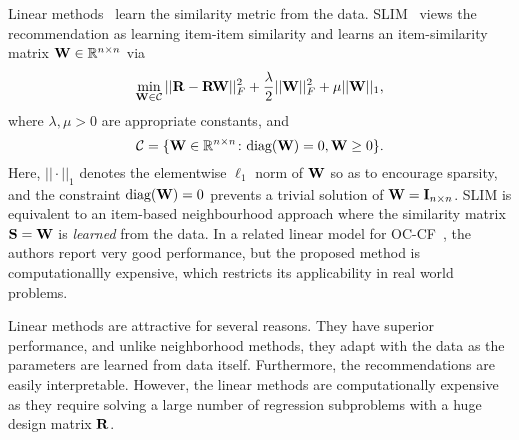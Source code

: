 Linear methods~\cite{Ning:2011, Sedhain:2016} learn the similarity metric from the data. SLIM~\citep{Ning:2011} views the recommendation as learning item-item similarity and learns an item-similarity matrix $\mathbf{W} \in \mathbb{R}^{n \times n}$ via
\begin{equation}
\label{eqn:slim}
\min_{ \mathbf{W} \in \mathcal{C} } || \mathbf{R} - \mathbf{R} \mathbf{W} ||_F^2 + \frac{\lambda}{2} || \mathbf{W} ||_F^2 + \mu || \mathbf{W} ||_1,
\end{equation}
where $\lambda, \mu > 0$ are appropriate constants, and
\begin{equation}
\label{eqn:slim-constraint}
\mathcal{C} = \{ \mathbf{W} \in \mathbb{R}^{n \times n} \colon \text{diag}( \mathbf{W} ) = 0, \mathbf{W} \geq 0 \}.
\end{equation}
Here, $|| \cdot ||_1$ denotes the elementwise $\ell_1$ norm of $\mathbf{W}$ so as to encourage sparsity, and the constraint $\text{diag}( \mathbf{W} ) = 0$ prevents a trivial solution of $\mathbf{W} = \mathbf{I}_{n \times n}$. SLIM is equivalent to an item-based neighbourhood approach where the similarity matrix $\mathbf{S} = \mathbf{W}$ is \emph{learned} from the data.
%
In a related linear model for OC-CF~\citep{Sedhain:2016}, the authors report very good performance, but the proposed method is computationallly expensive, which restricts its applicability in real world problems.


Linear methods are attractive for several reasons. They have superior performance, and unlike neighborhood methods, they adapt with the data as the parameters are learned from data itself. Furthermore, the recommendations are easily interpretable. However, the linear methods are computationally expensive as they require solving a large number of regression subproblems with a huge design matrix $\mathbf{R}$. 

